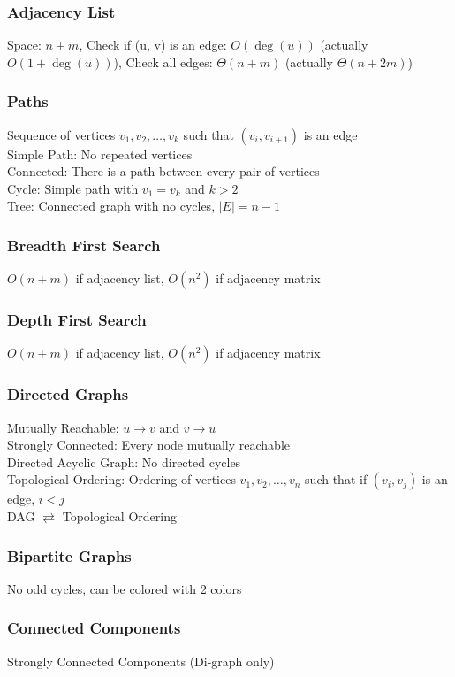 \documentclass{article}
\begin{document}
\begin{multicols*}{2}
        \subsubsection*{Adjacency List}
        Space: $n + m$, Check if (u, v) is an edge: $O(\deg(u))$ (actually $O(1 + \deg(u))$), Check
        all edges: $\Theta(n + m)$ (actually $\Theta(n + 2m)$)
        \subsubsection*{Paths}
        Sequence of vertices $v_1, v_2, \dots, v_k$ such that $(v_i, v_{i+1})$ is an edge\\
        Simple Path: No repeated vertices\\
        Connected: There is a path between every pair of vertices\\
        Cycle: Simple path with $v_1 = v_k$ and $k > 2$\\
        Tree: Connected graph with no cycles, $\lvert E \rvert = n - 1$
        \subsubsection*{Breadth First Search}
        $O(n + m)$ if adjacency list, $O(n^2)$ if adjacency matrix
        \subsubsection*{Depth First Search}
        $O(n + m)$ if adjacency list, $O(n^2)$ if adjacency matrix
        \subsubsection*{Directed Graphs}
        Mutually Reachable: $u \to v$ and $v \to u$\\
        Strongly Connected: Every node mutually reachable\\
        Directed Acyclic Graph: No directed cycles\\
        Topological Ordering: Ordering of vertices $v_1, v_2, \ldots, v_n$ such that if $(v_i,
        v_j)$ is an edge, $i < j$\\
        DAG $\rightleftarrows$ Topological Ordering
        \subsubsection*{Bipartite Graphs}
        No odd cycles, can be colored with 2 colors
        \subsubsection*{Connected Components}
        Strongly Connected Components (Di-graph only)

\end{multicols*}
\end{document}

